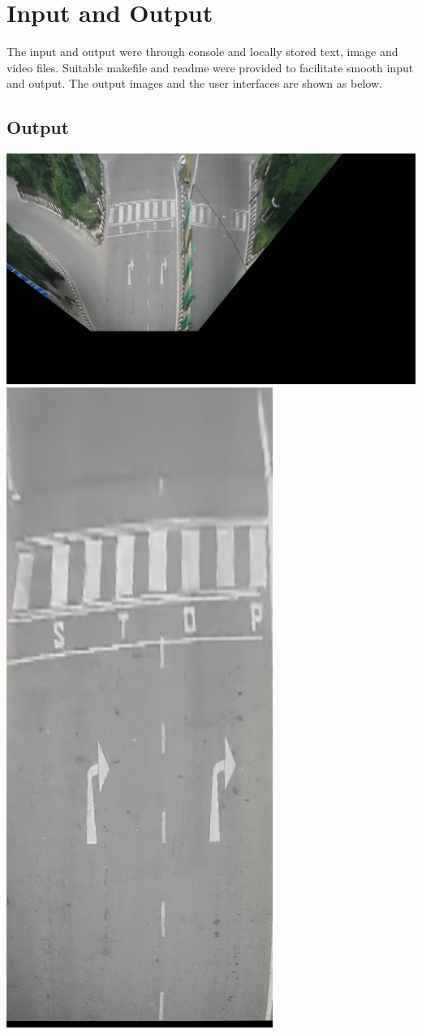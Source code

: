 \documentclass{article} %
\begin{document}
\section{Input and Output}
The input and output were through console and locally stored text, image and video files. Suitable makefile and readme were provided to facilitate smooth input and output. The output images and the user interfaces are shown as below.

\subsection{Output}
\includegraphics[scale = 0.19]{out_images/projected_out_empty.jpg}
\includegraphics[scale = 0.26]{out_images/cropped_out_empty.jpg}
\end{document}
